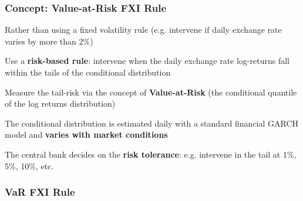\documentclass{beamer}
\newenvironment{largeitemize}{\itemize\addtolength{\itemsep}{10pt}}{\enditemize}
\begin{document}
\begin{frame}
  \frametitle{Concept: Value-at-Risk FXI Rule}
  \begin{largeitemize}
    \item Rather than using a fixed volatility rule (e.g. intervene if daily
      exchange rate varies by more than 2\%)
    \item Use a \textbf{risk-based rule}: intervene when the daily exchange
      rate log-returns fall within the
      tails of the conditional distribution
    \item Measure the tail-risk via the concept of \textbf{Value-at-Risk} (the
      conditional quantile of the log returns distribution) 
    \item The conditional distribution is estimated daily with a standard
      financial GARCH model and \textbf{varies with market conditions}
    \item The central bank decides on the \textbf{risk tolerance}:
      e.g. intervene in the tail at 1\%, 5\%, 10\%, etc.
  \end{largeitemize}
\end{frame}

\begin{frame}
  \frametitle{VaR FXI Rule}
\end{frame}
\end{document}
